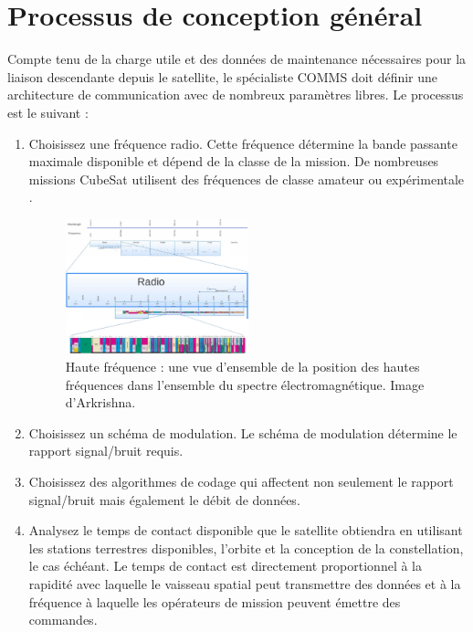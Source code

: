 \section{Processus de conception général} 
Compte tenu de la charge utile et des données de maintenance nécessaires pour la liaison descendante depuis le satellite, le spécialiste COMMS doit définir une architecture de communication avec de nombreux paramètres libres. Le processus est le suivant :

\begin{enumerate}
\item Choisissez une fréquence radio. Cette fréquence détermine la bande passante maximale disponible et dépend de la classe de la mission. De nombreuses missions CubeSat utilisent des fréquences de classe amateur ou expérimentale .

\begin{figure}[H] %
    \centering
    \includegraphics[width=0.5\textwidth]{figures/6-5.jpg}
    
    \caption{Haute fréquence : une vue d'ensemble de la position des hautes fréquences dans l'ensemble du spectre électromagnétique. Image d'Arkrishna.}
    \label{fig:communication2}
\end{figure}

\item Choisissez un schéma de modulation. Le schéma de modulation détermine le rapport signal/bruit requis.

\item Choisissez des algorithmes de codage qui affectent non seulement le rapport signal/bruit mais également le débit de données.
\item Analysez le temps de contact disponible que le satellite obtiendra en utilisant les stations terrestres disponibles, l'orbite et la conception de la constellation, le cas échéant. Le temps de contact est directement proportionnel à la rapidité avec laquelle le vaisseau spatial peut transmettre des données et à la fréquence à laquelle les opérateurs de mission peuvent émettre des commandes.


\end{enumerate}

